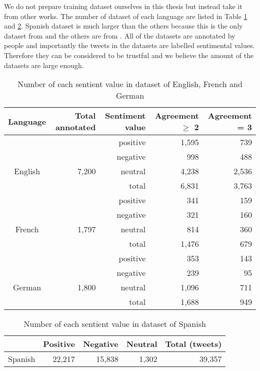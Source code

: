 We do not prepare training dataset ourselves in this thesis but instead take it from other works.
The number of dataset of each language are listed in Table \ref{tab:dataset2} and \ref{tab:dataset_esp}.
Spanish dataset is much larger than the others because this is the only dataset from \cite{dataset_spanish} and the others are from \cite{dataset}.
All of the datasets are annotated by people and importantly the tweets in the datasets are labelled sentimental values.
Therefore they can be considered to be trustful and we believe the amount of the datasets are large enough.
\begin{table}[ht]
	\caption{Number of each sentient value in dataset of English, French and German}
	\centering
	\begin{tabular}{|c|r|r|r|r|} \hline
	Language & Total annotated & Sentiment value & Agreement $\geq$ 2 & Agreement = 3\\ \hline \hline
	& & positive & 1,595 & 739 \\ \cline{3-5}
	& & negative & 998 & 488\\ \cline{3-5}
	English & 7,200 & neutral & 4,238 & 2,536 \\ \hline
	& & total & 6,831 & 3,763 \\ \hline
	& & positive & 341 & 159\\ \cline{3-5}
	& & negative & 321 & 160\\ \cline{3-5}
	French & 1,797 & neutral & 814 & 360  \\ \hline
	& & total & 1,476 & 679 \\ \hline
	& & positive & 353 & 143\\ \cline{3-5}
	& & negative & 239 & 95\\ \cline{3-5}
	German & 1,800 & neutral & 1,096 & 711\\ \hline
	& & total & 1,688 & 949\\ \hline
	\end{tabular}
	\label{tab:dataset2}
\end{table}

\begin{table}[ht]
	\caption{Number of each sentient value in dataset of Spanish}
	\centering
	\begin{tabular}{|c|r|r|r|r|} \hline
	{} & Positive & Negative & Neutral & Total (tweets)\\ \hline
	Spanish & 22,217 & 15,838 & 1,302 & 39,357 \\ \hline
	\end{tabular}
	\label{tab:dataset_esp}
\end{table}



